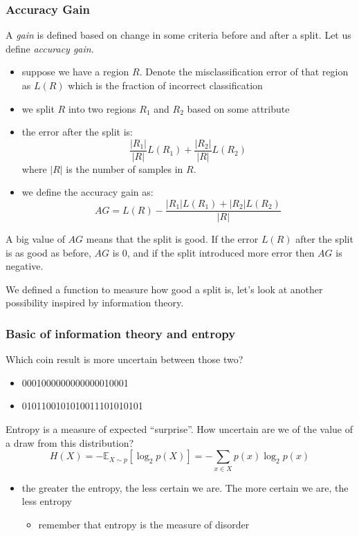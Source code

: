 \documentclass[11pt]{article}
\begin{document}
\subsubsection{Accuracy Gain}\label{accuracy-gain}

A \emph{gain} is defined based on change in some criteria before and
after a split. Let us define \emph{accuracy gain}.

\begin{itemize}
\tightlist
\item
  suppose we have a region \(R\). Denote the misclassification error of
  that region as \(L(R)\) which is the fraction of incorrect
  classification
\item
  we split \(R\) into two regions \(R_1\) and \(R_2\) based on some
  attribute
\item
  the error after the split is:
  \[\frac{|R_1|}{|R|}L(R_1) + \frac{|R_2|}{|R|}L(R_2)\] where \(|R|\) is
  the number of samples in \(R\).
\item
  we define the accuracy gain as:
  \[AG = L(R) - \frac{|R_1| L(R_1) + |R_2|L(R_2)}{|R|}\]
\end{itemize}

A big value of \(AG\) means that the split is good. If the error
\(L(R)\) after the split is as good as before, \(AG\) is \(0\), and if
the split introduced more error then \(AG\) is negative.

We defined a function to measure how good a split is, let's look at
another possibility inspired by information theory.

\subsubsection{Basic of information theory and
entropy}\label{basic-of-information-theory-and-entropy}

Which coin result is more uncertain between those two?

\begin{itemize}
\tightlist
\item
  0001000000000000010001
\item
  0101100101010011101010101
\end{itemize}

Entropy is a measure of expected ``surprise''. How uncertain are we of
the value of a draw from this distribution?
\[H(X) = -\mathbb{E}_{X\sim p}[\log_2 p(X)] = -\sum_{x\in X} p(x)\log_2p(x)\]

\begin{itemize}
\tightlist
\item
  the greater the entropy, the less certain we are. The more certain we
  are, the less entropy

  \begin{itemize}
  \tightlist
  \item
    remember that entropy is the measure of disorder
  \end{itemize}
\end{itemize}
\end{document}
